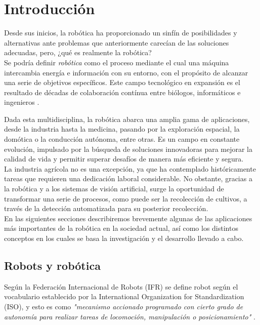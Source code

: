 \chapter{Introducción}
\label{cap:capitulo1}
\setcounter{page}{1}

Desde sus inicios, la robótica ha proporcionado un sinfín de posibilidades y alternativas ante problemas que anteriormente carecían de las soluciones adecuadas, pero, ¿qué es realmente la robótica?\\

Se podría definir \textit{robótica} como el proceso mediante el cual una máquina intercambia energía e información con su entorno, con el propósito de alcanzar una serie de objetivos específicos. Este campo tecnológico en expansión es el resultado de décadas de colaboración contínua entre biólogos, informáticos e ingenieros \cite{Koditschek21}.

Dada esta multidisciplina, la robótica abarca una amplia gama de aplicaciones, desde la industria hasta la medicina, pasando por la exploración espacial, la domótica o la conducción autónoma, entre otras. Es un campo en constante evolución, impulsado por la búsqueda de soluciones innovadoras para mejorar la calidad de vida y permitir superar desafíos de manera más eficiente y segura.\\

La industria agrícola no es una excepción, ya que ha contemplado históricamente tareas que requieren una dedicación laboral considerable. No obstante, gracias a la robótica y a los sistemas de visión artificial, surge la oportunidad de transformar una serie de procesos, como puede ser la recolección de cultivos, a través de la detección automatizada para su posterior recolección.\\

En las siguientes secciones describiremos brevemente algunas de las aplicaciones más importantes de la robótica en la sociedad actual, así como los distintos conceptos en los cuales se basa la investigación y el desarrollo llevado a cabo.\\

\section{Robots y robótica}
\label{sec:robótica} %

Según la Federación Internacional de Robots (IFR) se define robot según el vocabulario establecido por la International Organization for Standardization (ISO), y esto es como \textit{"mecanismo accionado programado con cierto grado de autonomía para realizar tareas de locomoción, manipulación o posicionamiento"} \cite{ISO8373}.\\  

